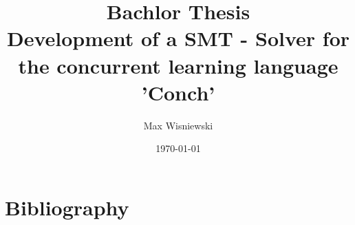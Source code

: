 \documentclass[USenglish,a4paper,11t]{article}
\author{Max Wisniewski}
\title{Bachlor Thesis\\ Development of a SMT - Solver for the concurrent learning language 'Conch'}
\date{\today}
\begin{document}
\maketitle





\section{Bibliography}



\end{document}
